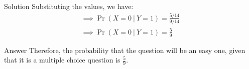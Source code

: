 \documentclass{beamer}
\providecommand{\pr}[1]{\ensuremath{\Pr\left(#1\right)}}
\numberwithin{equation}{subsection}
\begin{document}
\begin{frame}{Solution}
    Substituting the values, we have:
\begin{align}
    \implies \pr{X = 0\ |\ Y = 1} = \frac{5/14}{9/14}\\
    \implies \pr{X = 0\ |\ Y = 1} = \frac{5}{9}
\end{align}

\begin{block}{Answer}
    Therefore, the probability that the question will be an easy one, given that it is a multiple choice question is $\displaystyle\frac{5}{9}$.
\end{block}

\end{frame}
\end{document}
